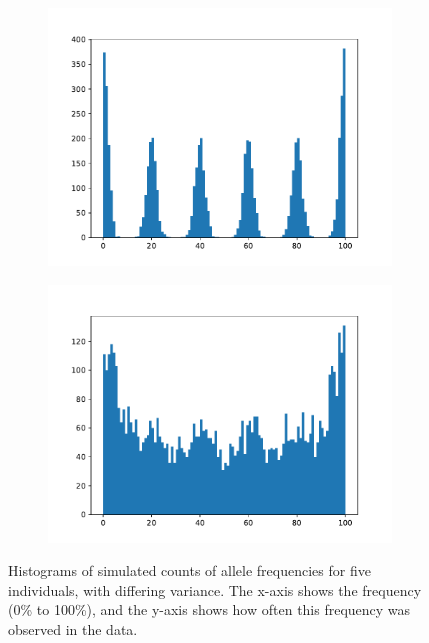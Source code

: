 \documentclass[letterpaper,10pt]{scrartcl}
\begin{document}
\begin{figure}[h]
    \begin{subfigure}[b]{0.5\textwidth}
    \includegraphics[width=\textwidth]{hist_2.pdf}
    \centering
    \end{subfigure}
    \begin{subfigure}[b]{0.5\textwidth}
    \includegraphics[width=\textwidth]{hist_7.pdf}
    \centering
    \end{subfigure}
\caption{
    Histograms of simulated counts of allele frequencies for five individuals, with differing variance.
    The x-axis shows the frequency (0\% to 100\%), and the y-axis shows how often this frequency was observed in the data.
}
\label{fig:hist}
\end{figure}
\end{document}
